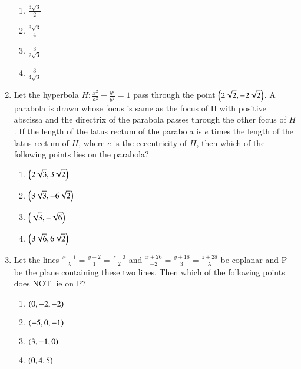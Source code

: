 \documentclass[journal]{IEEEtran}
\begin{document}
\begin{enumerate}
        \begin{multicols}{4}
            \begin{enumerate}
                \item $\frac{3\sqrt{3}}{2}$
                \item $\frac{3\sqrt{3}}{4}$
                \item $\frac{3}{2\sqrt{3}}$
                \item $\frac{3}{4\sqrt{3}}$
            \end{enumerate}
        \end{multicols}

    \item Let the hyperbola $H:\frac{x^2}{a^2}-\frac{y^2}{b^2}=1$ pass through the point $\left(2\sqrt{2},-2\sqrt{2}\right)$. A parabola is drawn whose focus is same as the focus of H with positive abscissa and the directrix of the parabola passes through the other focus of $H$. If the length of the latus rectum of the parabola is $e$ times the length of the latus rectum of $H$, where $e$ is the eccentricity of $H$, then which of the following points lies on the parabola?

        \begin{multicols}{4}
            \begin{enumerate}
                \item $\left(2\sqrt{3},3\sqrt{2}\right)$
                \item $\left(3\sqrt{3},-6\sqrt{2}\right)$
                \item $\left(\sqrt{3},-\sqrt{6}\right)$
                \item $\left(3\sqrt{6},6\sqrt{2}\right)$
            \end{enumerate}
        \end{multicols}

    \item Let the lines $\frac{x-1}{\lambda}=\frac{y-2}{1}=\frac{z-3}{2}$ and $\frac{x+26}{-2}=\frac{y+18}{3}=\frac{z+28}{\lambda}$ be coplanar and P be the plane containing these two lines. Then which of the following points does NOT lie on P?

        \begin{multicols}{4}
            \begin{enumerate}
                \item $\left(0, -2, -2\right)$
                \item $\left(-5, 0, -1\right)$
                \item $\left(3, -1, 0\right)$
                \item $\left(0, 4, 5\right)$
            \end{enumerate}
        \end{multicols}

\end{enumerate}
\end{document}
